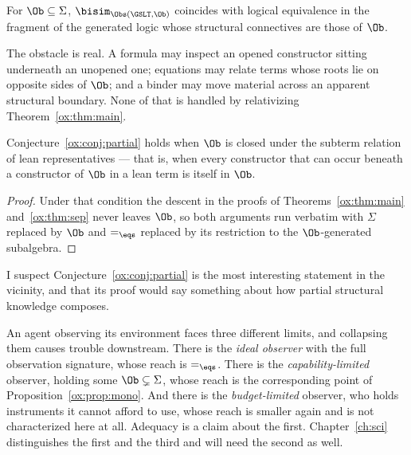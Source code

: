 \begin{conjecture}
\label{ox:conj:partial}
For $\Ob \subseteq \Sigma$, $\bisim_{\Obs(\GSLT,\Ob)}$ coincides with logical
equivalence in the fragment of the generated logic whose structural connectives are
those of $\Ob$.
\end{conjecture}

The obstacle is real. A formula may inspect an opened constructor sitting
underneath an unopened one; equations may relate terms whose roots lie on opposite
sides of $\Ob$; and a binder may move material across an apparent structural
boundary. None of that is handled by relativizing Theorem~\ref{ox:thm:main}.

\begin{proposition}
\label{ox:prop:downward}
Conjecture~\ref{ox:conj:partial} holds when $\Ob$ is closed under the subterm
relation of lean representatives --- that is, when every constructor that can occur
beneath a constructor of $\Ob$ in a lean term is itself in $\Ob$.
\end{proposition}

\begin{proof}
Under that condition the descent in the proofs of Theorems~\ref{ox:thm:main}
and~\ref{ox:thm:sep} never leaves $\Ob$, so both arguments run verbatim with
$\Sigma$ replaced by $\Ob$ and $=_{\eqs}$ replaced by its restriction to the
$\Ob$-generated subalgebra.
\end{proof}

I suspect Conjecture~\ref{ox:conj:partial} is the most interesting statement in the
vicinity, and that its proof would say something about how partial structural
knowledge composes.

\begin{remark}
\label{ox:rem:threerestrictions}
An agent observing its environment faces three different limits, and collapsing
them causes trouble downstream. There is the \emph{ideal observer} with the full
observation signature, whose reach is $=_{\eqs}$. There is the
\emph{capability-limited} observer, holding some $\Ob \subsetneq \Sigma$, whose
reach is the corresponding point of Proposition~\ref{ox:prop:mono}. And there is
the \emph{budget-limited} observer, who holds instruments it cannot afford to use,
whose reach is smaller again and is not characterized here at all. Adequacy is a
claim about the first. Chapter~\ref{ch:sci} distinguishes the first and the third
and will need the second as well.
\end{remark}

